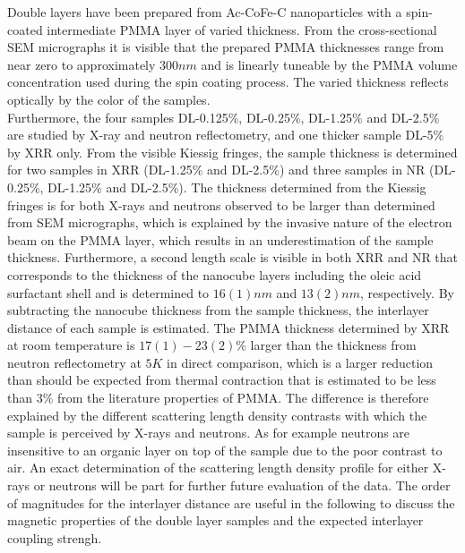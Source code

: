 \documentclass[\main/dresen_thesis.tex]{subfiles}
\begin{document}
  \label{sec:doublelayers:structuralCharacterization:summary}

  Double layers have been prepared from Ac-CoFe-C nanoparticles with a spin-coated intermediate PMMA layer of varied thickness.
  From the cross-sectional SEM micrographs it is visible that the prepared PMMA thicknesses range from near zero to approximately $300 \unit{nm}$ and is linearly tuneable by the PMMA volume concentration used during the spin coating process.
  The varied thickness reflects optically by the color of the samples.
  \\

  Furthermore, the four samples DL-0.125\%, DL-0.25\%, DL-1.25\% and DL-2.5\% are studied by X-ray and neutron reflectometry, and one thicker sample DL-5\% by XRR only.
  From the visible Kiessig fringes, the sample thickness is determined for two samples in XRR (DL-1.25\% and DL-2.5\%) and three samples in NR (DL-0.25\%, DL-1.25\% and DL-2.5\%).
  The thickness determined from the Kiessig fringes is for both X-rays and neutrons observed to be larger than determined from SEM micrographs, which is explained by the invasive nature of the electron beam on the PMMA layer, which results in an underestimation of the sample thickness.
  Furthermore, a second length scale is visible in both XRR and NR that corresponds to the thickness of the nanocube layers including the oleic acid surfactant shell and is determined to $16(1) \unit{nm}$ and $13(2) \unit{nm}$, respectively.
  By subtracting the nanocube thickness from the sample thickness, the interlayer distance of each sample is estimated.
  The PMMA thickness determined by XRR at room temperature is $17(1) - 23(2)\%$ larger than the thickness from neutron reflectometry at $5 \unit{K}$ in direct comparison, which is a larger reduction than should be expected from thermal contraction that is estimated to be less than $3 \%$ from the literature properties of PMMA.
  The difference is therefore explained by the different scattering length density contrasts with which the sample is perceived by X-rays and neutrons.
  As for example neutrons are insensitive to an organic layer on top of the sample due to the poor contrast to air.
  An exact determination of the scattering length density profile for either X-rays or neutrons will be part for further future evaluation of the data.
  The order of magnitudes for the interlayer distance are useful in the following to discuss the magnetic properties of the double layer samples and the expected interlayer coupling strengh.
\end{document}
